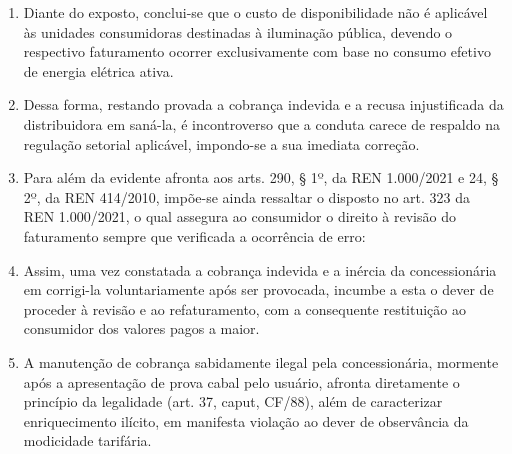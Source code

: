 \begin{enumerate}[resume]
{    (...)

    § 2º Não se aplica a cobrança pelo custo de disponibilidade definida no art. 98 no faturamento individual de um ponto de iluminação pública. (grifou-se)
}

\item Diante do exposto, conclui-se que o custo de disponibilidade não é aplicável às unidades consumidoras destinadas à iluminação pública, devendo o respectivo faturamento ocorrer exclusivamente com base no consumo efetivo de energia elétrica ativa.

\item Dessa forma, restando provada a cobrança indevida e a recusa injustificada da distribuidora em saná-la, é incontroverso que a conduta carece de respaldo na regulação setorial aplicável, impondo-se a sua imediata correção.

\item Para além da evidente afronta aos arts. 290, § 1º, da REN 1.000/2021 e 24, § 2º, da REN 414/2010, impõe-se ainda ressaltar o disposto no art. 323 da REN 1.000/2021, o qual assegura ao consumidor o direito à revisão do faturamento sempre que verificada a ocorrência de erro:

\item Assim, uma vez constatada a cobrança indevida e a inércia da concessionária em corrigi-la voluntariamente após ser provocada, incumbe a esta o dever de proceder à revisão e ao refaturamento, com a consequente restituição ao consumidor dos valores pagos a maior.

\item A manutenção de cobrança sabidamente ilegal pela concessionária, mormente após a apresentação de prova cabal pelo usuário, afronta diretamente o princípio da legalidade (art. 37, caput, CF/88), além de caracterizar enriquecimento ilícito, em manifesta violação ao dever de observância da modicidade tarifária.
\end{enumerate}

